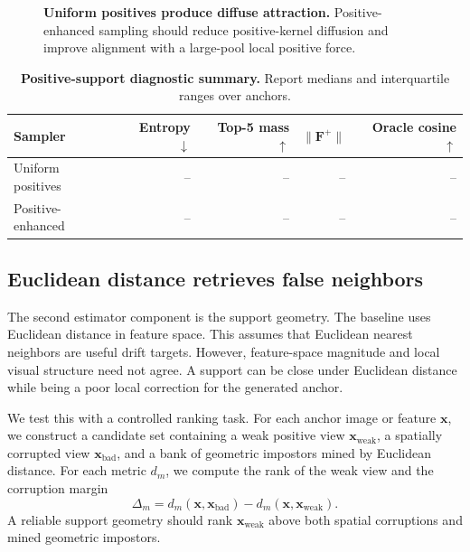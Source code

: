 \documentclass{article}
\newcommand{\placeholderbox}[2]{
\begin{center}
\fbox{
\begin{minipage}[c][#1][c]{0.92\linewidth}
\centering
\textcolor{mlgray}{#2}
\end{minipage}
}
\end{center}
}
\newcommand{\F}{\mathbf{F}}
\newcommand{\x}{\mathbf{x}}
\begin{document}
\begin{figure}[h!]
\centering
\placeholderbox{0.23\textheight}{
Positive-sampling diagnostic panel.\\
Paired plots over anchors: normalized entropy, top-5 mass, oracle-force cosine.\\
Compare uniform positives vs positive-enhanced positives at equal support budget.
}
\caption{
\textbf{Uniform positives produce diffuse attraction.}
Positive-enhanced sampling should reduce positive-kernel diffusion and improve alignment with a large-pool local positive force.
}
\label{fig:positive_sampling_probe}
\end{figure}

\begin{table}[h!]
\centering
\caption{
\textbf{Positive-support diagnostic summary.}
Report medians and interquartile ranges over anchors.
}
\label{tab:positive_sampling_summary}
\begin{tabular}{lrrrr}
\toprule
Sampler & Entropy $\downarrow$ & Top-5 mass $\uparrow$ & $\|\F^{+}\|$ & Oracle cosine $\uparrow$ \\
\midrule
Uniform positives & -- & -- & -- & -- \\
Positive-enhanced & -- & -- & -- & -- \\
\bottomrule
\end{tabular}
\end{table}

\subsection{Euclidean distance retrieves false neighbors}
\label{subsec:false_neighbors}

The second estimator component is the support geometry.
The baseline uses Euclidean distance in feature space.
This assumes that Euclidean nearest neighbors are useful drift targets.
However, feature-space magnitude and local visual structure need not agree.
A support can be close under Euclidean distance while being a poor local correction for the generated anchor.

We test this with a controlled ranking task.
For each anchor image or feature $\x$, we construct a candidate set containing a weak positive view $\x_{\mathrm{weak}}$, a spatially corrupted view $\x_{\mathrm{bad}}$, and a bank of geometric impostors mined by Euclidean distance.
For each metric $d_m$, we compute the rank of the weak view and the corruption margin
\begin{equation}
\Delta_m
=
d_m(\x,\x_{\mathrm{bad}})
-
d_m(\x,\x_{\mathrm{weak}}).
\label{eq:corruption_margin}
\end{equation}
A reliable support geometry should rank $\x_{\mathrm{weak}}$ above both spatial corruptions and mined geometric impostors.
\end{document}
